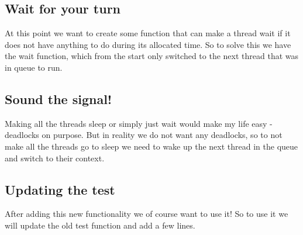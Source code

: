 \documentclass[a4paper, 12pt]{article}
\begin{document}
\subsection{Wait for your turn}
At this point we want to create some function that can make a thread wait if it does not have anything to do during its allocated time. So to solve this we have the wait function, which from the start only switched to the next thread that was in queue to run.

\subsection{Sound the signal!}
Making all the threads sleep or simply just wait would make my life easy - deadlocks on purpose. But in reality we do not want any deadlocks, so to not make all the threads go to sleep we need to wake up the next thread in the queue and switch to their context.

\subsection{Updating the test}
After adding this new functionality we of course want to use it! So to use it we will update the old test function and add a few lines.

\end{document}

